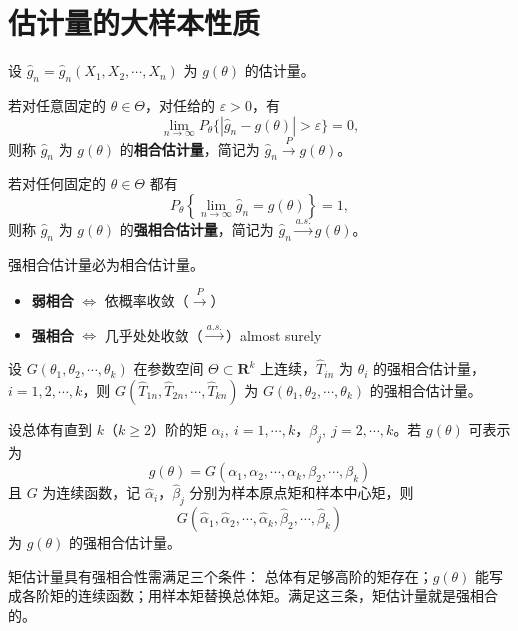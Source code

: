 \section{估计量的大样本性质}
\begin{definition}[相合估计量与强相合估计量]
设 $\hat{g}_n = \hat{g}_n(X_1, X_2, \cdots, X_n)$ 为 $g(\theta)$ 的估计量。

若对任意固定的 $\theta \in \Theta$，对任给的 $\varepsilon > 0$，有
\[
\lim_{n \to \infty} P_\theta\{|\hat{g}_n - g(\theta)| > \varepsilon\} = 0,
\]
则称 $\hat{g}_n$ 为 $g(\theta)$ 的\textbf{相合估计量}，简记为 $\hat{g}_n \xrightarrow{P} g(\theta)$。

若对任何固定的 $\theta \in \Theta$ 都有
\[
P_\theta\left\{\lim_{n \to \infty} \hat{g}_n = g(\theta)\right\} = 1,
\]
则称 $\hat{g}_n$ 为 $g(\theta)$ 的\textbf{强相合估计量}，简记为 $\hat{g}_n \xrightarrow{a.s.} g(\theta)$。

强相合估计量必为相合估计量。
\end{definition}
\begin{itemize}
  \item \textbf{弱相合} $\Leftrightarrow$ 依概率收敛（$\xrightarrow{P}$）
  \item \textbf{强相合} $\Leftrightarrow$ 几乎处处收敛（$\xrightarrow{a.s.}$）almost surely 
\end{itemize}
\begin{theorem}[强相合估计量经过连续函数变换后仍然是强相合的。]
设 $G(\theta_1, \theta_2, \cdots, \theta_k)$ 在参数空间 $\Theta \subset \mathbf{R}^k$ 上连续，$\hat{T}_{in}$ 为 $\theta_i$ 的强相合估计量，$i = 1, 2, \cdots, k$，则 $G(\hat{T}_{1n}, \hat{T}_{2n}, \cdots, \hat{T}_{kn})$ 为 $G(\theta_1, \theta_2, \cdots, \theta_k)$ 的强相合估计量。
\end{theorem}
\begin{theorem}[矩估计量的强相合性]
设总体有直到 $k$（$k \geq 2$）阶的矩 $\alpha_i,\ i = 1,\cdots,k$，$\beta_j,\ j = 2,\cdots,k$。若 $g(\theta)$ 可表示为
\[
g(\theta) = G(\alpha_1, \alpha_2, \cdots, \alpha_k, \beta_2, \cdots, \beta_k)
\]
且 $G$ 为连续函数，记 $\hat{\alpha}_i$，$\hat{\beta}_j$ 分别为样本原点矩和样本中心矩，则
\[
G(\hat{\alpha}_1, \hat{\alpha}_2, \cdots, \hat{\alpha}_k, \hat{\beta}_2, \cdots, \hat{\beta}_k)
\]
为 $g(\theta)$ 的强相合估计量。
\end{theorem}
\begin{note}
矩估计量具有强相合性需满足三个条件：
总体有足够高阶的矩存在；$g(\theta)$ 能写成各阶矩的连续函数；用样本矩替换总体矩。满足这三条，矩估计量就是强相合的。
\end{note}
